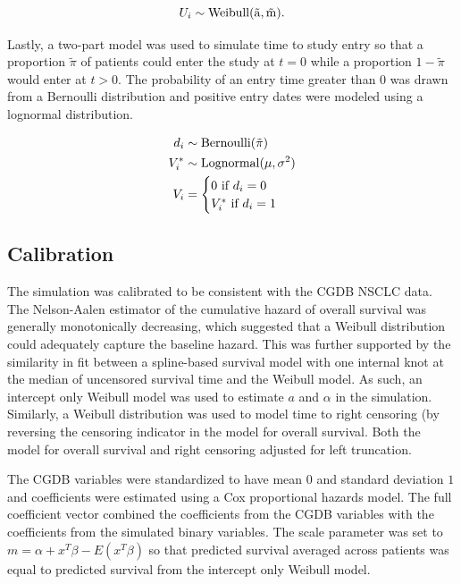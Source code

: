 \documentclass[11pt,final,fleqn]{article}\usepackage[]{graphicx}\usepackage[]{color}
\theoremstyle{plain}
\begin{document}
\begin{equation} 
U_i \sim \rm{Weibull}(\tilde{a}, \tilde{m}).
\end{equation} 

Lastly, a two-part model was used to simulate time to study entry so that a proportion $\tilde{\pi}$ of patients could enter the study at $t=0$ while a proportion $1-\tilde{\pi}$ would enter at $t>0$. The probability of an entry time greater than $0$ was drawn from a Bernoulli distribution and positive entry dates were modeled using a lognormal distribution. 

\begin{align}
d_i &\sim \rm{Bernoulli}(\tilde{\pi}) \\
V_i^{*} &\sim \rm{Lognormal}(\mu, \sigma^2) \\
V_i &=\begin{cases}
 0  \text{ if } d_i = 0\\
  V_i^{*}  \text{ if } d_i = 1
  \end{cases}
\end{align}

\subsection{Calibration} \label{subsec:sim-calibration}
The simulation was calibrated to be consistent with the CGDB NSCLC data. The Nelson-Aalen estimator of the cumulative hazard of overall survival was generally monotonically decreasing, which suggested that a Weibull distribution could adequately capture the baseline hazard. This was further supported by the similarity in fit between a spline-based survival model with one internal knot at the median of uncensored survival time and the Weibull model. As such, an intercept only Weibull model was used to estimate $a$ and $\alpha$ in the simulation. Similarly, a Weibull distribution was used to model time to right censoring (by reversing the censoring indicator in the model for overall survival. Both the model for overall survival and right censoring adjusted for left truncation. 

The CGDB variables were standardized to have mean $0$ and standard deviation $1$ and coefficients were estimated using a Cox proportional hazards model. The full coefficient vector combined the coefficients from the CGDB variables with the coefficients from the simulated binary variables. The scale parameter was set to $m = \alpha + x^T\beta - E(x^T\beta)$ so that predicted survival averaged across patients was equal to predicted survival from the intercept only Weibull model. 
\end{document}
